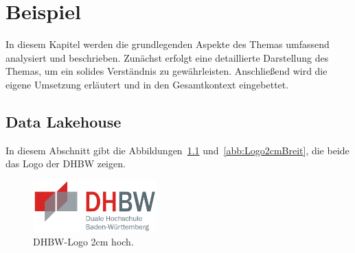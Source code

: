 \chapter{Beispiel}\label{chapter:Grundlagen}

In diesem Kapitel werden die grundlegenden Aspekte des Themas umfassend analysiert und beschrieben. Zunächst erfolgt eine detaillierte Darstellung des Themas, um ein solides Verständnis zu gewährleisten. Anschließend wird die eigene Umsetzung erläutert und in den Gesamtkontext eingebettet.

\section{Data Lakehouse}
In diesem Abschnitt gibt die Abbildungen~\ref{abb:Logo2cmHoch} und~\ref{abb:Logo2cmBreit}, die beide das Logo der DHBW zeigen.

\begin{figure}[htb]
\centering
\includegraphics[height=2cm]{graphics/dhbw.png}
\caption[DHBW-Logo 2cm hoch]{DHBW-Logo 2cm hoch.\footnotemark}
\label{abb:Logo2cmHoch}
\end{figure}

